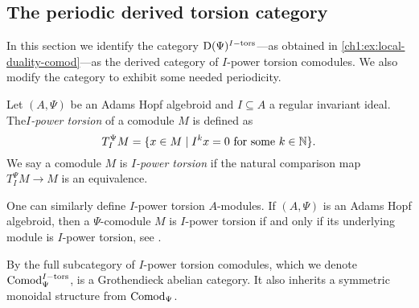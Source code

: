 
















\subsection{The periodic derived torsion category}
\label{ch1:ssec:the-algebraic-model}

In this section we identify the category $\mathrm{D}(\Psi)^{I-\mathrm{tors}}$---as obtained in \cref{ch1:ex:local-duality-comod}---as the derived category of $I$-power torsion comodules. We also modify the category to exhibit some needed periodicity. 

\begin{definition}
    \label{ch1:def:I-power-torsion-comodule}
    Let $(A,\Psi)$ be an Adams Hopf algebroid and $I\subseteq A$ a regular invariant ideal. The\emph{$I$-power torsion} of a comodule $M$ is defined as 
    $$T_I^\Psi M = \{x\in M \mid I^k x = 0 \text{ for some } k\in \mathbb{N}\}.$$
    We say a comodule $M$ is \emph{$I$-power torsion} if the natural comparison map $T_I^\Psi M\longrightarrow M$ is an equivalence. 
\end{definition}

\begin{remark}
    \label{ch1:rm:torsion-iff-underlying-is-torsion}
    One can similarly define $I$-power torsion $A$-modules. If $(A,\Psi)$ is an Adams Hopf algebroid, then a $\Psi$-comodule $M$ is $I$-power torsion if and only if its underlying module is $I$-power torsion, see \cite[5.7]{barthel-heard-valenzuela_2018}. 
\end{remark}

\begin{remark}
    \label{ch1:rm:torsion-comodules-grothendieck-monoidal}
    By \cite[5.10]{barthel-heard-valenzuela_2018} the full subcategory of $I$-power torsion comodules, which we denote $\mathrm{Comod}_\Psi^{I-\mathrm{tors}}$, is a Grothendieck abelian category. It also inherits a symmetric monoidal structure from $\mathrm{Comod}_\Psi$. 
\end{remark}

